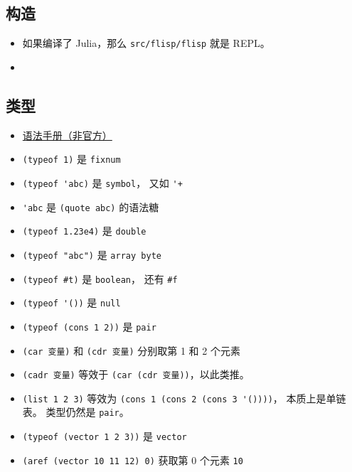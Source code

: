 
\subsection{构造}
\begin{itemize}
\item 如果编译了 Julia，那么 \verb`src/flisp/flisp` 就是 REPL。
\item 
\end{itemize}


\subsection{类型}
\begin{itemize}
\item \href{https://code.google.com/archive/p/femtolisp/wikis/Manual.wiki}{语法手册（非官方）}
\item \verb`(typeof 1)` 是 \verb`fixnum`
\item \verb`(typeof 'abc)` 是 \verb`symbol`， 又如 \verb`'+`
\item \verb`'abc` 是 \verb`(quote abc)` 的语法糖
\item \verb`(typeof 1.23e4)` 是 \verb`double`
\item \verb`(typeof "abc")` 是 \verb`array byte`
\item \verb`(typeof #t)` 是 \verb`boolean`， 还有 \verb`#f`
\item \verb`(typeof '())` 是 \verb`null`
\item \verb`(typeof (cons 1 2))` 是 \verb`pair`
\item \verb`(car 变量)` 和 \verb`(cdr 变量)` 分别取第 1 和 2 个元素
\item \verb`(cadr 变量)` 等效于 \verb`(car (cdr 变量))`，以此类推。
\item \verb`(list 1 2 3)` 等效为 \verb`(cons 1 (cons 2 (cons 3 '())))`， 本质上是单链表。 类型仍然是 \verb`pair`。
\item \verb`(typeof (vector 1 2 3))` 是 \verb`vector`
\item \verb`(aref (vector 10 11 12) 0)` 获取第 0 个元素 \verb`10`

\end{itemize}

